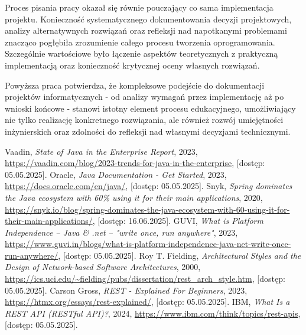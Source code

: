 \documentclass[a4paper,12pt,openany]{book}
\begin{document}
Proces pisania pracy okazał się równie pouczający co sama implementacja projektu. Konieczność systematycznego dokumentowania decyzji projektowych, analizy alternatywnych rozwiązań oraz refleksji nad napotkanymi problemami znacząco pogłębiła zrozumienie całego procesu tworzenia oprogramowania. Szczególnie wartościowe było łączenie aspektów teoretycznych z praktyczną implementacją oraz konieczność krytycznej oceny własnych rozwiązań.

Powyższa praca potwierdza, że kompleksowe podejście do dokumentacji projektów informatycznych - od analizy wymagań przez implementację aż po wnioski końcowe - stanowi istotny element procesu edukacyjnego, umożliwiający nie tylko realizację konkretnego rozwiązania, ale również rozwój umiejętności inżynierskich oraz zdolności do refleksji nad własnymi decyzjami technicznymi.



\listoffigures{} %

\begin{thebibliography}{99}
 Vaadin, \textit{State of Java in the Enterprise Report}, 2023, \url{https://vaadin.com/blog/2023-trends-for-java-in-the-enterprise}, [dostęp: 05.05.2025].
 Oracle, \textit{Java Documentation - Get Started}, 2023, \url{https://docs.oracle.com/en/java/}, [dostęp: 05.05.2025].
 Snyk, \textit{Spring dominates the Java ecosystem with 60\% using it for their main applications}, 2020, \url{https://snyk.io/blog/spring-dominates-the-java-ecosystem-with-60-using-it-for-their-main-applications/}, [dostęp: 16.06.2025].
 GUVI, \textit{What is Platform Independence – Java \& .net – "write once, run anywhere"}, 2023, \url{https://www.guvi.in/blogs/what-is-platform-independence-java-net-write-once-run-anywhere/}, [dostęp: 05.05.2025].
 Roy T. Fielding, \textit{Architectural Styles and the Design of Network-based Software Architectures}, 2000, \url{https://ics.uci.edu/~fielding/pubs/dissertation/rest_arch_style.htm}, [dostęp: 05.05.2025].
 Carson Gross, \textit{REST - Explained For Beginners}, 2023, \url{https://htmx.org/essays/rest-explained/}, [dostęp: 05.05.2025].
 IBM, \textit{What Is a REST API (RESTful API)?}, 2024, \url{https://www.ibm.com/think/topics/rest-apis}, [dostęp: 05.05.2025].
\end{thebibliography}
\end{document}

